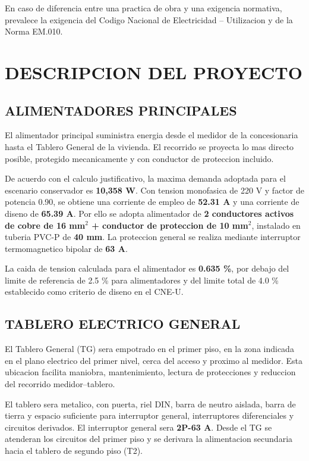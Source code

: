 En caso de diferencia entre una practica de obra y una exigencia normativa, prevalece la exigencia del Codigo Nacional de Electricidad -- Utilizacion y de la Norma EM.010.

\section{DESCRIPCION DEL PROYECTO}

\subsection{ALIMENTADORES PRINCIPALES}

El alimentador principal suministra energia desde el medidor de la concesionaria hasta el Tablero General de la vivienda. El recorrido se proyecta lo mas directo posible, protegido mecanicamente y con conductor de proteccion incluido.

De acuerdo con el calculo justificativo, la maxima demanda adoptada para el escenario conservador es \textbf{10,358 W}. Con tension monofasica de 220 V y factor de potencia 0.90, se obtiene una corriente de empleo de \textbf{52.31 A} y una corriente de diseno de \textbf{65.39 A}. Por ello se adopta alimentador de \textbf{2 conductores activos de cobre de 16 mm$^2$ + conductor de proteccion de 10 mm$^2$}, instalado en tuberia PVC-P de \textbf{40 mm}. La proteccion general se realiza mediante interruptor termomagnetico bipolar de \textbf{63 A}.

La caida de tension calculada para el alimentador es \textbf{0.635 \%}, por debajo del limite de referencia de 2.5 \% para alimentadores y del limite total de 4.0 \% establecido como criterio de diseno en el CNE-U.

\subsection{TABLERO ELECTRICO GENERAL}

El Tablero General (TG) sera empotrado en el primer piso, en la zona indicada en el plano electrico del primer nivel, cerca del acceso y proximo al medidor. Esta ubicacion facilita maniobra, mantenimiento, lectura de protecciones y reduccion del recorrido medidor--tablero.

El tablero sera metalico, con puerta, riel DIN, barra de neutro aislada, barra de tierra y espacio suficiente para interruptor general, interruptores diferenciales y circuitos derivados. El interruptor general sera \textbf{2P-63 A}. Desde el TG se atenderan los circuitos del primer piso y se derivara la alimentacion secundaria hacia el tablero de segundo piso (T2).

